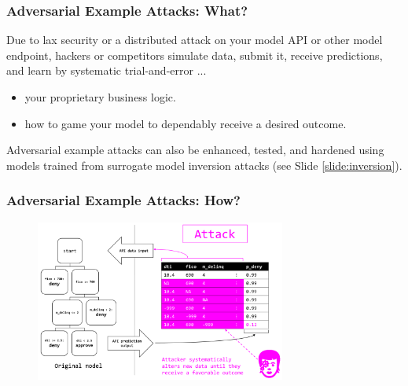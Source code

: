 \documentclass[11pt,
               aspectratio=169,
               hyperref={colorlinks}
               ]{beamer}
\begin{document}
			\begin{frame}
		
				\frametitle{Adversarial Example Attacks: \textbf{What?}}		

Due to lax security or a distributed attack on your model API or other model endpoint, hackers or competitors simulate data, submit it, receive predictions, and learn by systematic trial-and-error ... 		
				\begin{itemize}
					\item your proprietary business logic.
					\item how to game your model to dependably receive a desired outcome. 
				\end{itemize}
				\vspace{10pt}
Adversarial example attacks can also be enhanced, tested, and hardened using models trained from surrogate model inversion attacks (see Slide \ref{slide:inversion}).

			\end{frame}	
	
			\begin{frame}[label={slide:adversary}]
		
				\frametitle{Adversarial Example Attacks: \textbf{How?}}		
			
				\begin{figure}[htb]
					\begin{center}
						\includegraphics[height=150pt]{img/adversary.PNG}
					\end{center}
				\end{figure}	

			\end{frame}	
			
\end{document}
